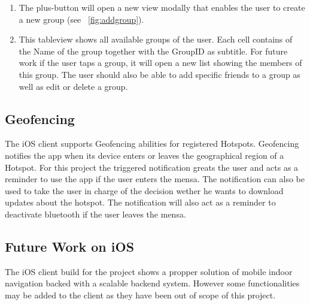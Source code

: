 \begin{enumerate}
 \item The plus-button will open a new view modally that enables the user to create a new group (see ~\ref{fig:addgroup}).
 \item This tableview shows all available groups of the user. Each cell contains of the Name of the group together with the GroupID as subtitle. For future work if the user taps a group, it will open a new list showing the members of this group. The user should also be able to add specific friends to a group as well as edit or delete a group.
\end{enumerate} 

\subsection{Geofencing}
The iOS client supports Geofencing abilities for registered Hotspots. Geofencing notifies the app when its device enters or leaves the geographical region of a Hotspot. For this project the triggered notification greats the user and acts as a reminder to use the app if the user enters the mensa. The notification can also be used to take the user in charge of the decision wether he wants to download updates about the hotspot. The notification will also act as a reminder to deactivate bluetooth if the user leaves the mensa.


\subsection{Future Work on iOS}
The iOS client build for the project shows a propper solution of mobile indoor navigation backed with a scalable backend system. However some functionalities may be added to the client as they have been out of scope of this project.

